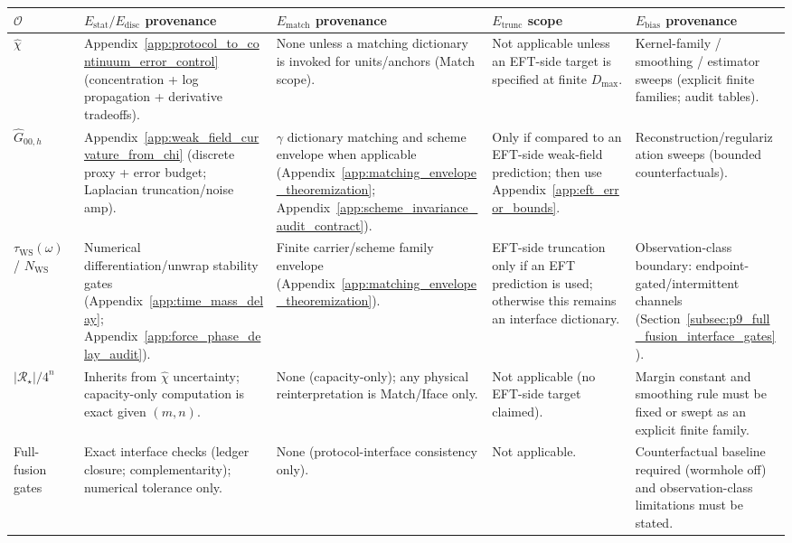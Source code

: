 \begin{center}
\scriptsize
\setlength{\tabcolsep}{6pt}
\renewcommand{\arraystretch}{1.15}
\begin{tabular}{p{} p{} p{} p{} p{}}
\toprule
$\mathcal{O}$ & $E_{\mathrm{stat}}/E_{\mathrm{disc}}$ provenance & $E_{\mathrm{match}}$ provenance & $E_{\mathrm{trunc}}$ scope & $E_{\mathrm{bias}}$ provenance \\
\midrule
$\widehat\chi$ & Appendix~\ref{app:protocol_to_continuum_error_control} (concentration + log propagation + derivative tradeoffs). & None unless a matching dictionary is invoked for units/anchors (Match scope). & Not applicable unless an EFT-side target is specified at finite $D_{\max}$. & Kernel-family / smoothing / estimator sweeps (explicit finite families; audit tables). \\
$\widehat G_{00,h}$ & Appendix~\ref{app:weak_field_curvature_from_chi} (discrete proxy + error budget; Laplacian truncation/noise amp). & $\gamma$ dictionary matching and scheme envelope when applicable (Appendix~\ref{app:matching_envelope_theoremization}; Appendix~\ref{app:scheme_invariance_audit_contract}). & Only if compared to an EFT-side weak-field prediction; then use Appendix~\ref{app:eft_error_bounds}. & Reconstruction/regularization sweeps (bounded counterfactuals). \\
$\tau_{\mathrm{WS}}(\omega)$ / $N_{\mathrm{WS}}$ & Numerical differentiation/unwrap stability gates (Appendix~\ref{app:time_mass_delay}; Appendix~\ref{app:force_phase_delay_audit}). & Finite carrier/scheme family envelope (Appendix~\ref{app:matching_envelope_theoremization}). & EFT-side truncation only if an EFT prediction is used; otherwise this remains an interface dictionary. & Observation-class boundary: endpoint-gated/intermittent channels (Section~\ref{subsec:p9_full_fusion_interface_gates}). \\
$|\mathcal{R}_\star|/4^n$ & Inherits from $\widehat\chi$ uncertainty; capacity-only computation is exact given $(m,n)$. & None (capacity-only); any physical reinterpretation is Match/Iface only. & Not applicable (no EFT-side target claimed). & Margin constant and smoothing rule must be fixed or swept as an explicit finite family. \\
Full-fusion gates & Exact interface checks (ledger closure; complementarity); numerical tolerance only. & None (protocol-interface consistency only). & Not applicable. & Counterfactual baseline required (wormhole off) and observation-class limitations must be stated. \\
\bottomrule
\end{tabular}
\end{center}